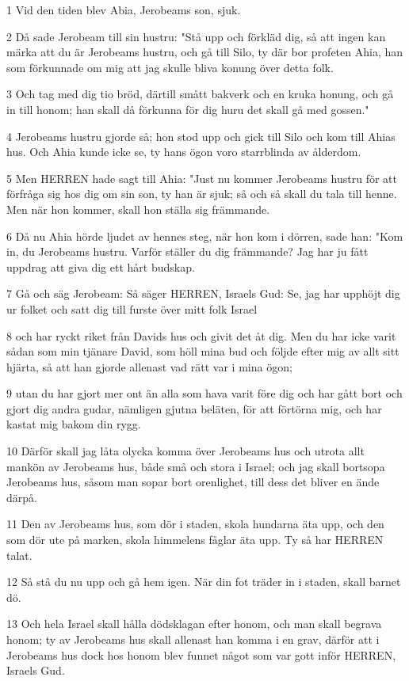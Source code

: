 \par 1 Vid den tiden blev Abia, Jerobeams son, sjuk.
\par 2 Då sade Jerobeam till sin hustru: "Stå upp och förkläd dig, så att ingen kan märka att du är Jerobeams hustru, och gå till Silo, ty där bor profeten Ahia, han som förkunnade om mig att jag skulle bliva konung över detta folk.
\par 3 Och tag med dig tio bröd, därtill smått bakverk och en kruka honung, och gå in till honom; han skall då förkunna för dig huru det skall gå med gossen."
\par 4 Jerobeams hustru gjorde så; hon stod upp och gick till Silo och kom till Ahias hus. Och Ahia kunde icke se, ty hans ögon voro starrblinda av ålderdom.
\par 5 Men HERREN hade sagt till Ahia: "Just nu kommer Jerobeams hustru för att förfråga sig hos dig om sin son, ty han är sjuk; så och så skall du tala till henne. Men när hon kommer, skall hon ställa sig främmande.
\par 6 Då nu Ahia hörde ljudet av hennes steg, när hon kom i dörren, sade han: "Kom in, du Jerobeams hustru. Varför ställer du dig främmande? Jag har ju fått uppdrag att giva dig ett hårt budskap.
\par 7 Gå och säg Jerobeam: Så säger HERREN, Israels Gud: Se, jag har upphöjt dig ur folket och satt dig till furste över mitt folk Israel
\par 8 och har ryckt riket från Davids hus och givit det åt dig. Men du har icke varit sådan som min tjänare David, som höll mina bud och följde efter mig av allt sitt hjärta, så att han gjorde allenast vad rätt var i mina ögon;
\par 9 utan du har gjort mer ont än alla som hava varit före dig och har gått bort och gjort dig andra gudar, nämligen gjutna beläten, för att förtörna mig, och har kastat mig bakom din rygg.
\par 10 Därför skall jag låta olycka komma över Jerobeams hus och utrota allt mankön av Jerobeams hus, både små och stora i Israel; och jag skall bortsopa Jerobeams hus, såsom man sopar bort orenlighet, till dess det bliver en ände därpå.
\par 11 Den av Jerobeams hus, som dör i staden, skola hundarna äta upp, och den som dör ute på marken, skola himmelens fåglar äta upp. Ty så har HERREN talat.
\par 12 Så stå du nu upp och gå hem igen. När din fot träder in i staden, skall barnet dö.
\par 13 Och hela Israel skall hålla dödsklagan efter honom, och man skall begrava honom; ty av Jerobeams hus skall allenast han komma i en grav, därför att i Jerobeams hus dock hos honom blev funnet något som var gott inför HERREN, Israels Gud.
